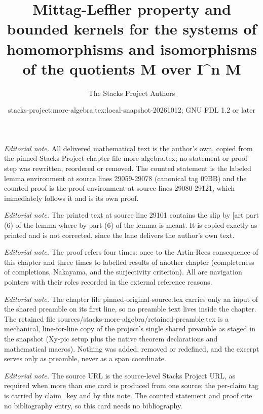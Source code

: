 \documentclass[10pt,a4paper]{amsart}
\title{Mittag-Leffler property and bounded kernels for the systems of homomorphisms and isomorphisms of the quotients M over I\textasciicircum{}n M}
\author{The Stacks Project Authors}
\date{stacks-project:more-algebra.tex:local-snapshot-20261012; GNU FDL 1.2 or later}
\theoremstyle{plain}
\theoremstyle{definition}
\theoremstyle{remark}
\numberwithin{equation}{subsection}
\begin{document}
\maketitle
\setcounter{subsection}{1}
\noindent\textit{Editorial note.} All delivered mathematical text is the author's own, copied from the pinned Stacks Project chapter file more-algebra.tex; no statement or proof step was rewritten, reordered or removed. The counted statement is the labeled lemma environment at source lines 29059-29078 (canonical tag 09BB) and the counted proof is the proof environment at source lines 29080-29121, which immediately follows it and is its own proof.\par\medskip
\noindent\textit{Editorial note.} The printed text at source line 29101 contains the slip by [art part (6) of the lemma where by part (6) of the lemma is meant. It is copied exactly as printed and is not corrected, since the lane delivers the author's own text.\par\medskip
\noindent\textit{Editorial note.} The proof refers four times: once to the Artin-Rees consequence of this chapter and three times to labelled results of another chapter (completeness of completions, Nakayama, and the surjectivity criterion). All are navigation pointers with their roles recorded in the external reference reasons.\par\medskip
\noindent\textit{Editorial note.} The chapter file pinned-original-source.tex carries only an input of the shared preamble on its first line, so no preamble text lives inside the chapter. The retained file sources/stacks-more-algebra/retained-preamble.tex is a mechanical, line-for-line copy of the project's single shared preamble as staged in the snapshot (Xy-pic setup plus the native theorem declarations and mathematical macros). Nothing was added, removed or redefined, and the excerpt serves only as preamble, never as a span coordinate.\par\medskip
\noindent\textit{Editorial note.} The source URL is the source-level Stacks Project URL, as required when more than one card is produced from one source; the per-claim tag is carried by claim\_key and by this note. The counted statement and proof cite no bibliography entry, so this card needs no bibliography.\par\medskip
\end{document}
